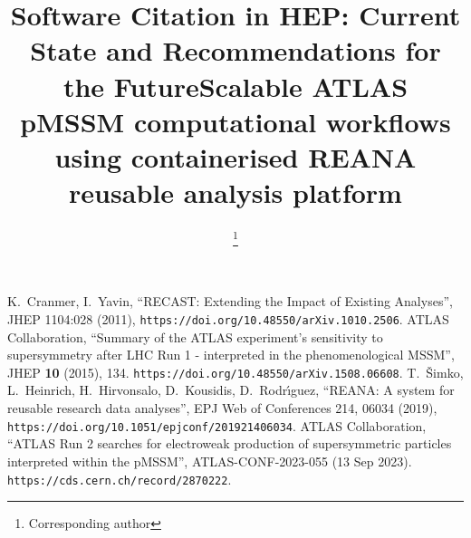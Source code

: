 \documentclass{latex/webofc}
\begin{document}
%
\title{Software Citation in HEP: Current State and Recommendations for the Future}

\title{Scalable ATLAS pMSSM computational workflows using containerised REANA reusable analysis platform}

\author{   \and
           \and
           \and
           \and
           \and
           \and
           \fnsep\thanks{Corresponding author } \and
           \and
          }


\abstract{%
 
}
%
\maketitle
%


%

%

%

%


\begin{thebibliography}{00}
 K.~Cranmer, I.~Yavin, ``RECAST: Extending the Impact of Existing Analyses'', JHEP 1104:028 (2011), \texttt{https://doi.org/10.48550/arXiv.1010.2506}.
 ATLAS Collaboration, ``Summary of the ATLAS experiment's sensitivity to supersymmetry after LHC Run 1 - interpreted in the phenomenological MSSM'', JHEP \textbf{10} (2015), 134. \texttt{https://doi.org/10.48550/arXiv.1508.06608}.
 T.~\v{S}imko,  L.~Heinrich,  H.~Hirvonsalo,  D.~Kousidis,  D.~Rodr\'{\i}guez, ``REANA: A system for reusable research data analyses'', EPJ Web of Conferences 214, 06034 (2019), \texttt{https://doi.org/10.1051/epjconf/201921406034}.
 ATLAS Collaboration, ``ATLAS Run 2 searches for electroweak production of supersymmetric particles interpreted within the pMSSM'', ATLAS-CONF-2023-055 (13 Sep 2023). \texttt{https://cds.cern.ch/record/2870222}.
\end{thebibliography}

\end{document}
